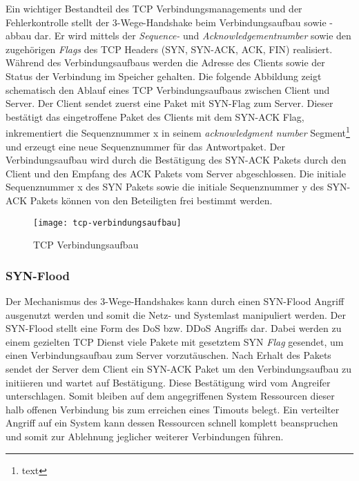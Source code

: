 Ein wichtiger Bestandteil des \ac{TCP} Verbindungsmanagements und der Fehlerkontrolle stellt der 3-Wege-Handshake beim Verbindungsaufbau sowie -abbau dar. Er wird mittels der \textit{Sequence-} und \textit{Acknowledgementnumber} sowie den zugehörigen \textit{Flags} des \ac{TCP} Headers (\ac{SYN}, \ac{SYN-ACK}, \ac{ACK}, \ac{FIN}) realisiert. Während des Verbindungsaufbaus werden die Adresse des Clients sowie der Status der Verbindung im Speicher gehalten. Die folgende Abbildung zeigt schematisch den Ablauf eines \ac{TCP} Verbindungsaufbaus zwischen Client und Server. Der Client sendet zuerst eine Paket mit SYN-Flag zum Server. Dieser bestätigt das eingetroffene Paket des Clients mit dem SYN-ACK Flag, inkrementiert die Sequenznummer x in seinem \textit{acknowledgment number} Segment\footnote{text} und erzeugt eine neue Sequenznummer für das Antwortpaket. Der Verbindungsaufbau wird durch die Bestätigung des SYN-ACK Pakets durch den Client und den Empfang des ACK Pakets vom Server abgeschlossen. Die initiale Sequenznummer x des SYN Pakets sowie die initiale Sequenznummer y des SYN-ACK Pakets können von den Beteiligten frei bestimmt werden.

\begin{figure}[h]
    \centering
    \texttt{[image: tcp-verbindungsaufbau]}
    \caption{TCP Verbindungsaufbau}
    \label{Analyse:TCP Verbindungsaufbau}
  \end{figure}
  
\clearpage

\subsubsection{SYN-Flood}
Der Mechanismus des 3-Wege-Handshakes kann durch einen SYN-Flood Angriff ausgenutzt werden und somit die Netz- und Systemlast manipuliert werden. Der SYN-Flood stellt eine Form des \ac{DoS} bzw. \ac{DDoS} Angriffs dar. Dabei werden zu einem gezielten \ac{TCP} Dienst viele Pakete mit gesetztem SYN \textit{Flag} gesendet, um einen Verbindungsaufbau zum Server vorzutäuschen. Nach Erhalt des Pakets sendet der Server dem Client ein SYN-ACK Paket um den Verbindungsaufbau zu initiieren und wartet auf Bestätigung. Diese Bestätigung wird vom Angreifer unterschlagen. Somit bleiben auf dem angegriffenen System Ressourcen dieser halb offenen Verbindung bis zum erreichen eines Timouts belegt. Ein verteilter Angriff auf ein System kann dessen Ressourcen schnell komplett beanspruchen und somit zur Ablehnung jeglicher weiterer Verbindungen führen.


